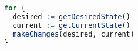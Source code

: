 \begin{lstfloat}
\begin{lstlisting}[language=R, caption={Ukázka CRD device}, label={sample:controller}]
for {
  desired := getDesiredState()
  current := getCurrentState()
  makeChanges(desired, current)
}
\end{lstlisting}
\end{lstfloat}